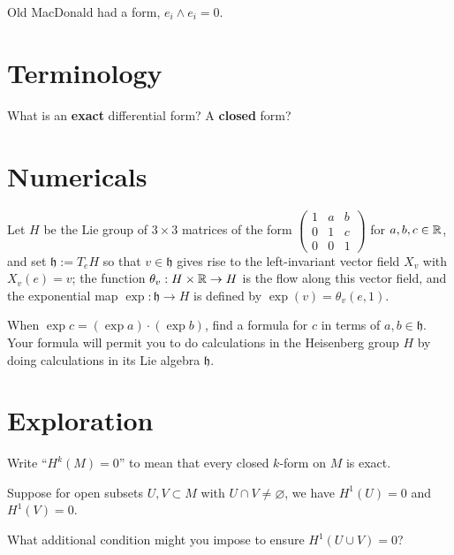 \documentclass{homework}
\author{Jim Fowler}
\begin{document}
\maketitle

\begin{inspiration}
  Old MacDonald had a form, $e_i \wedge e_i = 0$. 
\end{inspiration}

\section{Terminology}

\begin{problem}
  What is an \textbf{exact} differential form?  A \textbf{closed} form?
\end{problem}

\section{Numericals}

\begin{problem} Let $H$ be the Lie group of $3 \times 3$ matrices of
the form 
  $\displaystyle\begin{pmatrix}
    1 & a & b \\
    0 & 1 & c \\
    0 & 0 & 1
  \end{pmatrix}$ for $a, b, c \in \mathbb{R}$, and set $\mathfrak{h} := T_e H$
so that $v \in \mathfrak{h}$ gives rise to the left-invariant vector
field $X_v$ with $X_v(e) = v$; the function $\theta_{v} : H \times \mathbb{R}
\to H$ is the flow along this vector field, and the exponential map
$\exp : \mathfrak{h} \to H$ is defined by $\exp(v) = \theta_v(e,1)$.

When $\exp c = (\exp a) \cdot (\exp b)$, find a formula for $c$ in
terms of $a, b \in \mathfrak{h}$.  Your formula will permit you to do
calculations in the Heisenberg group $H$ by doing calculations in its Lie
algebra $\mathfrak{h}$.
\end{problem}

\section{Exploration}

\begin{problem}
Write ``$H^k(M) = 0$'' to mean that every closed $k$-form on $M$ is exact.

  Suppose for open subsets $U, V \subset M$ with $U \cap V \neq
  \varnothing$, we have $H^1(U) = 0$ and $H^1(V) = 0$.

  What additional condition might you impose to ensure $H^1(U \cup V)
= 0$?
\end{problem}
\end{document}
